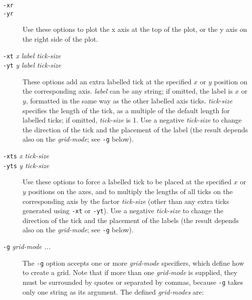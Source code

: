 \documentclass{book}
\begin{document}
\begin{description}
%
%
\item[{\tt -xr}]
\item[{\tt -yr}]
Use these options to plot the x axis at the top of the plot, or the y
axis on the right side of the plot.

%
%
\item[{\tt -xt} {\em x label tick-size}]
\item[{\tt -yt} {\em y label tick-size}]
These options add an extra labelled tick at the specified $x$ or $y$ position
on the corresponding axis.  {\em label} can be any string;  if omitted, the
label is $x$ or $y$, formatted in the same way as the other labelled axis
ticks.  {\em tick-size} specifies the length of the tick, as a multiple of
the default length for labelled ticks;  if omitted, {\em tick-size} is 1.
Use a negative {\em tick-size} to change the direction of the tick and the
placement of the label (the result depends also on the {\em grid-mode};
see {\tt -g} below).

%
%
\item[{\tt -xts} {\em x tick-size}]
\item[{\tt -yts} {\em y tick-size}]
Use these options to force a labelled tick to be placed at the specified $x$ or
$y$ positions on the axes, and to multiply the lengths of all ticks on the
corresponding axis by the factor {\em tick-size} (other than any extra ticks
generated using {\tt -xt} or {\tt -yt}).  Use a negative {\em tick-size} to
change the direction of the tick and the placement of the labels (the result
depends also on the {\em grid-mode}; see {\tt -g} below).

%
\item[{\tt -g} {\em grid-mode ...}]
The {\tt -g} option accepts one or more {\em grid-mode} specifiers,
which define how to create a grid.  Note that if more than one {\em
grid-mode} is supplied, they must be surrounded by quotes or separated
by commas, because {\tt -g} takes only one string as its argument.
The defined {\em grid-modes} are:


\end{description}
\end{document}
